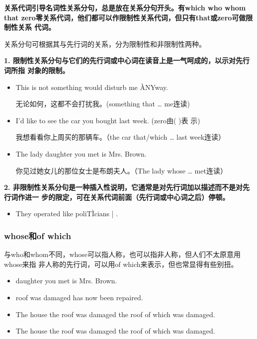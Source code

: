 \textbf{关系代词引导名词性关系分句，总是放在关系分句开头。有which who whom that
  zero零关系代词，他们都可以作限制性关系代词，但只有that或zero可做限制性关系
  代词。}

关系分句可根据其与先行词的关系，分为限制性和非限制性两种。

\textbf{1. 限制性关系分句与它们的先行词或中心词在读音上是一气呵成的，以示对先行词所指
  对象的限制。}
\begin{itemize}
\item This is not something  would disturb me \`{A}NYway.

  无论如何，这都不会打扰我。(something that \ldots{} me连读)
\item I'd like to see the car  you bought last week. (zero由( )表
  示)

  我想看看你上周买的那辆车。（the car that/which \ldots{} last week连读）
\item The lady  daughter you met is Mrs. Brown.

  你见过她女儿的那位女士是布朗夫人。（The lady whose \ldots{} met连读）
\end{itemize}

\textbf{2. 非限制性关系分句是一种插入性说明，它通常是对先行词加以描述而不是对先行词作进一
  步的限定，可在关系代词前面（先行词或中心词之后）停顿。}
\begin{itemize}
\item  They operated like poliT\`{I}cians | .
\end{itemize}

\subsubsection{whose和of which}

与who和whom不同，whose可以指人称，也可以指非人称，但人们不太原意用whose来指
非人称的先行词，可以用of which来表示，但也常显得有些别扭。
\begin{itemize}
\item {} daughter you met is Mrs. Brown.
\item {} roof was damaged has now been repaired.
\item The house  the roof was damaged the roof of which was damaged.
\item The house the roof  was damaged the roof of which was damaged.
\end{itemize}

